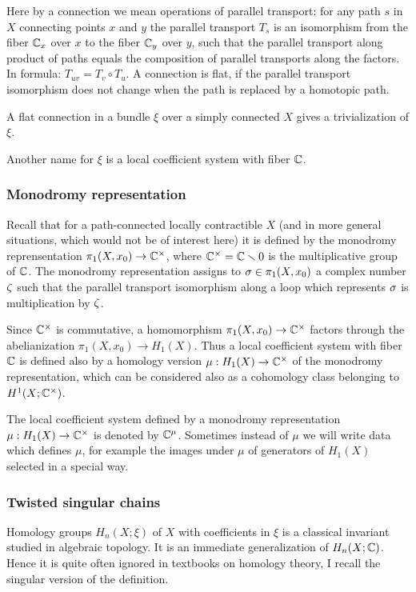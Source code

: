 \documentclass{article}
\numberwithin{equation}{section}
\begin{document}
Here by a {\sfit connection\/} we mean operations of
{\sfit parallel transport\/}: for any path $s$ in $X$ connecting 
points $x$ and
$y$ the parallel transport $T_s$ is an isomorphism from the fiber $\mathbb C_x$
over $x$ to the fiber $\mathbb C_y$ over $y$, such that the parallel transport
along product of paths equals the composition of parallel transports along the
factors. In formula: $T_{uv}=T_v\circ T_u$. A connection is flat, if
the parallel transport isomorphism does not change when the path is
replaced by a homotopic path.

A flat connection in a bundle $\xi$ over a simply connected $X$ gives a
trivialization of $\xi$. 

Another name for $\xi$ is a {\sfit local
coefficient system\/} with fiber $\mathbb C$. 

\subsubsection{Monodromy representation}\label{sT.1.2} 
Recall that for a path-connected
locally contractible $X$ (and in more general situations, which would
not be of interest here) it is defined by the {\sfit monodromy
reprensentation\/} $\pi_1(X,x_0)\to\mathbb C^\times$, where 
$\mathbb C^\times=\mathbb C\smallsetminus0$ is the
multiplicative group of $\mathbb C$. The monodromy representation assigns to
$\sigma\in\pi_1(X,x_0)$ a complex number $\zeta$ such that the parallel 
transport 
isomorphism along a loop which represents $\sigma$ is multiplication by $\zeta$.

Since $\mathbb C^\times$ is commutative, a
homomorphism $\pi_1(X,x_0)\to\mathbb C^\times$ factors through the 
abelianization
$\pi_1(X,x_0)\to H_1(X)$. Thus a local coefficient system with fiber
$\mathbb C$ is defined also by a homology version $\mu:H_1(X)\to\mathbb C^\times$ 
of the monodromy  representation, which can be considered also as a 
cohomology class belonging to $H^1(X;\mathbb C^\times)$. 

The local coefficient system defined by a monodromy representation
$\mu:H_1(X)\to\mathbb C^\times$ is denoted by $\mathbb C^{\mu}$. Sometimes instead of
$\mu$ we will write data which defines $\mu$, for example the images
under $\mu$ of generators of $H_1(X)$ selected in a special way.

\subsubsection{Twisted singular chains}\label{sT.1.3} 
Homology groups $H_n(X;\xi)$ of $X$ with coefficients in $\xi$ is a
classical invariant studied in algebraic topology. It is an immediate
generalization of $H_n(X;\mathbb C)$. Hence it is quite often ignored in
textbooks on homology theory, I recall the singular version of 
the definition.
\end{document}
